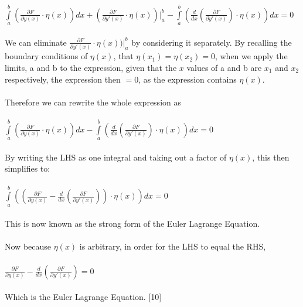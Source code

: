 \documentclass[12pt]{report}
\begin{document}
\\
\\
\(\int\limits_a^b (\frac{\partial F}{\partial y(x)} \cdot \eta (x))dx + (\frac{\partial F}{\partial y'(x)} \cdot \eta (x))\Biggr|_{a}^{b} - \int\limits_a^b (\frac{d}{dx}(\frac{\partial F}{\partial y'(x)}) \cdot \eta (x)) dx = 0\)
\\
\\
We can eliminate \(\frac{\partial F}{\partial y'(x)} \cdot \eta (x))\Biggr|_{a}^{b}\) by considering it separately. By recalling the boundary conditions of \(\eta (x)\), that \(\eta (x_{1}) = \eta (x_{2}) = 0\), when we apply the limits, a and b to the expression, given that the \(x\) values of a and b are \(x_{1}\) and \(x_{2}\) respectively, the expression then \( = 0\), as the expression contains \(\eta (x)\).
\\
\\
Therefore we can rewrite the whole expression as
\\
\\
\(\int\limits_a^b (\frac{\partial F}{\partial y(x)} \cdot \eta (x))dx - \int\limits_a^b (\frac{d}{dx}(\frac{\partial F}{\partial y'(x)}) \cdot \eta (x)) dx = 0\)
\\
\\
By writing the LHS as one integral and taking out a factor of \(\eta (x)\), this then simplifies to:
\\
\\
\(\int\limits_a^b ((\frac{\partial F}{\partial y(x)} - \frac{d}{dx}(\frac{\partial F}{\partial y'(x)})) \cdot \eta (x)) dx = 0\)
\\
\\
This is now known as the strong form of the Euler Lagrange Equation.
\\
\\
Now because \(\eta (x)\) is arbitrary, in order for the LHS to equal the RHS,
\\
\\
\(\frac{\partial F}{\partial y(x)} - \frac{d}{dx}(\frac{\partial F}{\partial y'(x)}) = 0\)
\\
\\
Which is the Euler Lagrange Equation.
[10]
\end{document}
